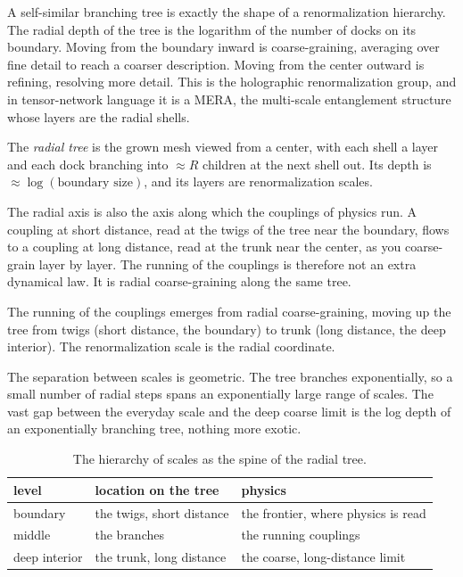 A self-similar branching tree is exactly the shape of a renormalization hierarchy. The radial depth of the tree is the logarithm of the number of docks on its boundary. Moving from the boundary inward is coarse-graining, averaging over fine detail to reach a coarser description. Moving from the center outward is refining, resolving more detail. This is the holographic renormalization group, and in tensor-network language it is a MERA, the multi-scale entanglement structure whose layers are the radial shells.

\begin{definition}
The \emph{radial tree} is the grown mesh viewed from a center, with each shell a layer and each dock branching into $\approx R$ children at the next shell out. Its depth is $\approx \log(\text{boundary size})$, and its layers are renormalization scales.
\end{definition}

The radial axis is also the axis along which the couplings of physics run. A coupling at short distance, read at the twigs of the tree near the boundary, flows to a coupling at long distance, read at the trunk near the center, as you coarse-grain layer by layer. The running of the couplings is therefore not an extra dynamical law. It is radial coarse-graining along the same tree.

\begin{result}
The running of the couplings emerges from radial coarse-graining, moving up the tree from twigs (short distance, the boundary) to trunk (long distance, the deep interior). The renormalization scale is the radial coordinate.
\end{result}

The separation between scales is geometric. The tree branches exponentially, so a small number of radial steps spans an exponentially large range of scales. The vast gap between the everyday scale and the deep coarse limit is the log depth of an exponentially branching tree, nothing more exotic.

\begin{table}[ht]
\centering
\begin{tabular}{@{}lll@{}}
\toprule
level & location on the tree & physics \\
\midrule
boundary & the twigs, short distance & the frontier, where physics is read \\
middle & the branches & the running couplings \\
deep interior & the trunk, long distance & the coarse, long-distance limit \\
\bottomrule
\end{tabular}
\caption{The hierarchy of scales as the spine of the radial tree.}
\label{tab:scale-hierarchy}
\end{table}


